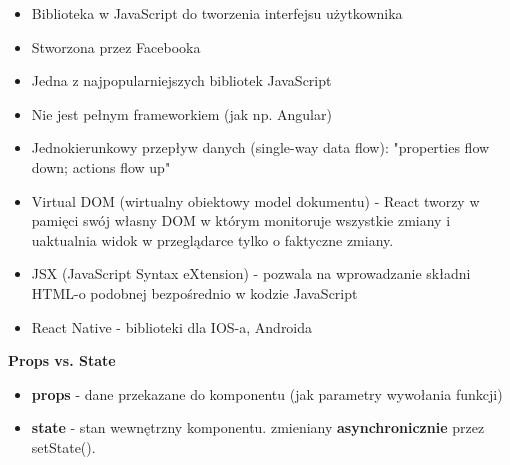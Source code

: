 \documentclass[../main.tex]{subfiles}
\begin{document}
\begin{itemize}
    \item Biblioteka w JavaScript do tworzenia interfejsu użytkownika
    \item Stworzona przez Facebooka
    \item Jedna z najpopularniejszych bibliotek JavaScript
    \item Nie jest pełnym frameworkiem (jak np. Angular)\\

    \item Jednokierunkowy przepływ danych (single-way data flow): "properties flow down; actions flow up"
    \item Virtual DOM (wirtualny obiektowy model dokumentu) - React tworzy w pamięci swój własny DOM w którym monitoruje
    wszystkie zmiany i uaktualnia widok w przeglądarce tylko o faktyczne zmiany.
    \item JSX (JavaScript Syntax eXtension) - pozwala na wprowadzanie składni HTML-o podobnej bezpośrednio w kodzie JavaScript
    \item React Native - biblioteki dla IOS-a, Androida
\end{itemize}

\textbf{Props vs. State}
\begin{itemize}
    \item \textbf{props} - dane przekazane do komponentu (jak parametry wywołania funkcji)
    \item \textbf{state} - stan wewnętrzny komponentu. zmieniany \textbf{asynchronicznie} przez setState().
\end{itemize}
\end{document}

